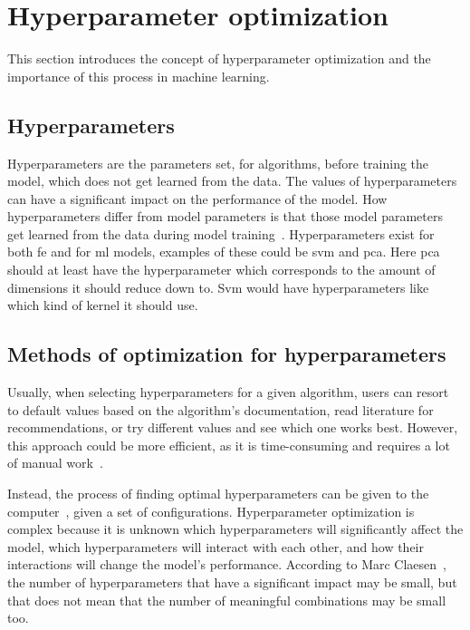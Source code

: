 \section{Hyperparameter optimization}\label{sec:hyperparam}
This section introduces the concept of hyperparameter optimization and the importance of this process in machine learning.


\subsection{Hyperparameters}\label{subsec:hyperparam-what}
Hyperparameters are the parameters set, for algorithms, before training the model, which does not get learned from the data. The values of hyperparameters can have a significant impact on the performance of the model. How hyperparameters differ from model parameters is that those model parameters get learned from the data during model training~\cite{probst2019tunability}. Hyperparameters exist for both \gls{fe} and for \gls{ml} models, examples of these could be \gls{svm} and \gls{pca}. Here \gls{pca} should at least have the hyperparameter which corresponds to the amount of dimensions it should reduce down to. \gls{Svm} would have hyperparameters like which kind of kernel it should use.

\subsection{Methods of optimization for hyperparameters}\label{subsec:hyperparam-how}
Usually, when selecting hyperparameters for a given algorithm, users can resort to default values based on the algorithm's documentation, read literature for recommendations, or try different values and see which one works best. However, this approach could be more efficient, as it is time-consuming and requires a lot of manual work~\cite{probst2019tunability}.

Instead, the process of finding optimal hyperparameters can be given to the computer~\cite{automated-machine-learning}, given a set of configurations. Hyperparameter optimization is complex because it is unknown which hyperparameters will significantly affect the model, which hyperparameters will interact with each other, and how their interactions will change the model's performance. According to Marc Claesen~\cite{hyperparam-search}, the number of hyperparameters that have a significant impact may be small, but that does not mean that the number of meaningful combinations may be small too.

